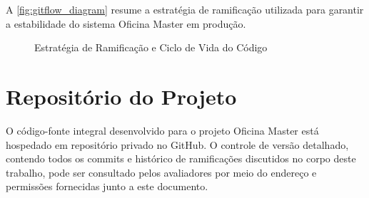 A \autoref{fig:gitflow_diagram} resume a estratégia de ramificação utilizada para garantir a estabilidade do sistema Oficina Master em produção.

\begin{figure}[htb]
    \caption{\label{fig:gitflow_diagram}Estratégia de Ramificação e Ciclo de Vida do Código}
    \centering
\end{figure}

\section{Repositório do Projeto}
\label{apx:repositorio}

O código-fonte integral desenvolvido para o projeto Oficina Master está hospedado em repositório privado no GitHub. O controle de versão detalhado, contendo todos os commits e histórico de ramificações discutidos no corpo deste trabalho, pode ser consultado pelos avaliadores por meio do endereço e permissões fornecidas junto a este documento.
